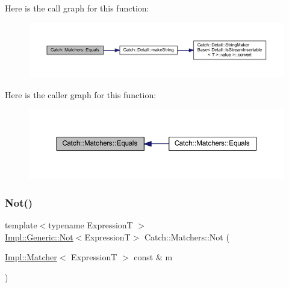 Here is the call graph for this function\+:\nopagebreak
\begin{figure}[H]
\begin{center}
\leavevmode
\includegraphics[width=350pt]{namespace_catch_1_1_matchers_a7454444261cc4af7ee0b0bc82cf74284_cgraph}
\end{center}
\end{figure}
Here is the caller graph for this function\+:\nopagebreak
\begin{figure}[H]
\begin{center}
\leavevmode
\includegraphics[width=350pt]{namespace_catch_1_1_matchers_a7454444261cc4af7ee0b0bc82cf74284_icgraph}
\end{center}
\end{figure}
\hypertarget{namespace_catch_1_1_matchers_ae3c192dc15c973c38f07376d4debdc34}{}\label{namespace_catch_1_1_matchers_ae3c192dc15c973c38f07376d4debdc34} 
\subsubsection{\texorpdfstring{Not()}{Not()}}
{\footnotesize\ttfamily template$<$typename ExpressionT $>$ \\
\hyperlink{class_catch_1_1_matchers_1_1_impl_1_1_generic_1_1_not}{Impl\+::\+Generic\+::\+Not}$<$ExpressionT$>$ Catch\+::\+Matchers\+::\+Not (\begin{DoxyParamCaption}\item[{\hyperlink{struct_catch_1_1_matchers_1_1_impl_1_1_matcher}{Impl\+::\+Matcher}$<$ ExpressionT $>$ const \&}]{m }\end{DoxyParamCaption})\hspace{0.3cm}{\ttfamily [inline]}}



